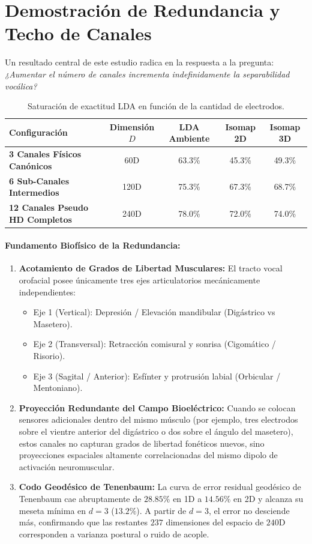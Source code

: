 \documentclass[11pt,a4paper,openany]{book}
\theoremstyle{definition}
\begin{document}
\section{Demostración de Redundancia y Techo de Canales}

Un resultado central de este estudio radica en la respuesta a la pregunta: \emph{¿Aumentar el número de canales incrementa indefinidamente la separabilidad vocálica?}

\begin{table}[H]
\centering
\begin{tabular}{l c c c c}
\toprule
\textbf{Configuración} & \textbf{Dimensión $D$} & \textbf{LDA Ambiente} & \textbf{Isomap 2D} & \textbf{Isomap 3D} \\
\midrule
\textbf{3 Canales Físicos Canónicos} & 60D & 63.3\% & 45.3\% & 49.3\% \\
\textbf{6 Sub-Canales Intermedios} & 120D & 75.3\% & 67.3\% & 68.7\% \\
\textbf{12 Canales Pseudo HD Completos} & 240D & 78.0\% & 72.0\% & 74.0\% \\
\bottomrule
\end{tabular}
\caption{Saturación de exactitud LDA en función de la cantidad de electrodos.}
\label{tab:saturacion}
\end{table}

\paragraph{Fundamento Biofísico de la Redundancia:}
\begin{enumerate}
    \item \textbf{Acotamiento de Grados de Libertad Musculares:} El tracto vocal orofacial posee únicamente tres ejes articulatorios mecánicamente independientes:
    \begin{itemize}
        \item Eje 1 (Vertical): Depresión / Elevación mandibular (Digástrico vs Masetero).
        \item Eje 2 (Transversal): Retracción comisural y sonrisa (Cigomático / Risorio).
        \item Eje 3 (Sagital / Anterior): Esfínter y protrusión labial (Orbicular / Mentoniano).
    \end{itemize}
    \item \textbf{Proyección Redundante del Campo Bioeléctrico:} Cuando se colocan sensores adicionales dentro del mismo músculo (por ejemplo, tres electrodos sobre el vientre anterior del digástrico o dos sobre el ángulo del masetero), estos canales no capturan grados de libertad fonéticos nuevos, sino proyecciones espaciales altamente correlacionadas del mismo dipolo de activación neuromuscular.
    \item \textbf{Codo Geodésico de Tenenbaum:} La curva de error residual geodésico de Tenenbaum cae abruptamente de $28.85\%$ en 1D a $14.56\%$ en 2D y alcanza su meseta mínima en $d=3$ ($13.2\%$). A partir de $d=3$, el error no desciende más, confirmando que las restantes $237$ dimensiones del espacio de $240$D corresponden a varianza postural o ruido de acople.
\end{enumerate}
\end{document}

